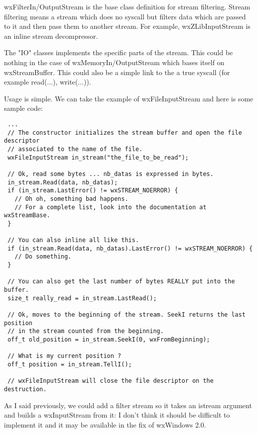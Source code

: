 wxFilterIn/OutputStream is the base class definition for stream filtering.
Stream filtering means a stream which does no syscall but filters data
which are passed to it and then pass them to another stream.
For example, wxZLibInputStream is an inline stream decompressor.

The "IO" classes implements the specific parts of the stream. This could be
nothing in the case of wxMemoryIn/OutputStream which bases itself on
wxStreamBuffer. This could also be a simple link to the a true syscall
(for example read(...), write(...)).


Usage is simple. We can take the example of wxFileInputStream and here is some sample
code:

\begin{verbatim}
 ...
 // The constructor initializes the stream buffer and open the file descriptor
 // associated to the name of the file.
 wxFileInputStream in_stream("the_file_to_be_read");

 // Ok, read some bytes ... nb_datas is expressed in bytes.
 in_stream.Read(data, nb_datas);
 if (in_stream.LastError() != wxSTREAM_NOERROR) {
   // Oh oh, something bad happens.
   // For a complete list, look into the documentation at wxStreamBase.
 }

 // You can also inline all like this.
 if (in_stream.Read(data, nb_datas).LastError() != wxSTREAM_NOERROR) {
   // Do something.
 }

 // You can also get the last number of bytes REALLY put into the buffer.
 size_t really_read = in_stream.LastRead();

 // Ok, moves to the beginning of the stream. SeekI returns the last position 
 // in the stream counted from the beginning.
 off_t old_position = in_stream.SeekI(0, wxFromBeginning);
 
 // What is my current position ?
 off_t position = in_stream.TellI();

 // wxFileInputStream will close the file descriptor on the destruction.
\end{verbatim}


As I said previously, we could add a filter stream so it takes an istream
argument and builds a wxInputStream from it: I don't think it should 
be difficult to implement it and it may be available in the fix of wxWindows 2.0.

